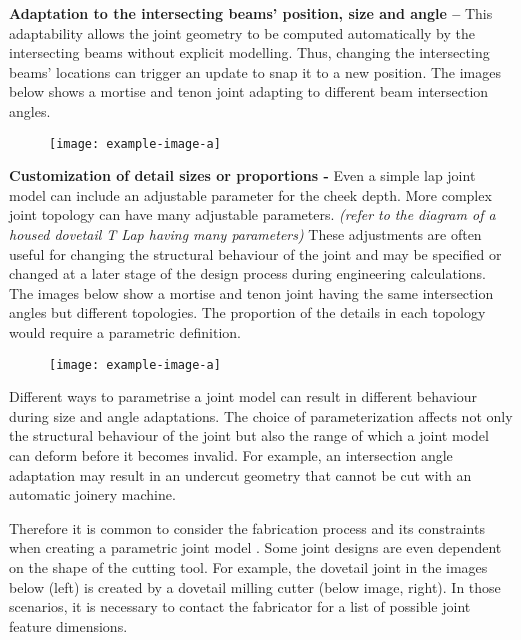 \textbf{Adaptation to the intersecting beams' position, size and angle --} This adaptability allows the joint geometry to be computed automatically by the intersecting beams without explicit modelling. Thus, changing the intersecting beams’ locations can trigger an update to snap it to a new position. The images below shows a mortise and tenon joint adapting to different beam intersection angles.

\begin{figure}[H]
    \centering
    \texttt{[image: example-image-a]}
\end{figure}

\textbf{Customization of detail sizes or proportions - }Even a simple lap joint model can include an adjustable parameter for the cheek depth. More complex joint topology can have many adjustable parameters. \textit{(refer to the diagram of a housed dovetail T Lap having many parameters) }These adjustments are often useful for changing the structural behaviour of the joint and may be specified or changed at a later stage of the design process during engineering calculations. The images below show a mortise and tenon joint having the same intersection angles but different topologies. The proportion of the details in each topology would require a parametric definition.

\begin{figure}[H]
    \centering
    \texttt{[image: example-image-a]}
\end{figure}

Different ways to parametrise a joint model can result in different behaviour during size and angle adaptations. The choice of parameterization affects not only the structural behaviour of the joint but also the range of which a joint model can deform before it becomes invalid. For example, an intersection angle adaptation may result in an undercut geometry that cannot be cut with an automatic joinery machine.

Therefore it is common to consider the fabrication process and its constraints when creating a parametric joint model \parencite{vestartasDesigntoFabricationWorkflowRawSawnTimber2021}. Some joint designs are even dependent on the shape of the cutting tool. For example, the dovetail joint in the images below (left) is created by a dovetail milling cutter (below image, right). In those scenarios, it is necessary to contact the fabricator for a list of possible joint feature dimensions. 

